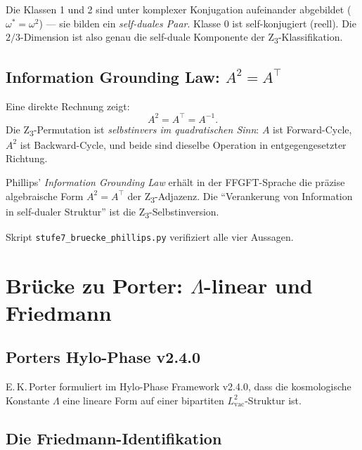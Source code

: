 Die Klassen 1 und 2 sind unter komplexer Konjugation aufeinander abgebildet (\(\omega^* = \omega^2\)) — sie bilden ein \emph{self-duales Paar}. Klasse 0 ist self-konjugiert (reell). Die \(2/3\)-Dimension ist also genau die self-duale Komponente der Z\textsubscript{3}-Klassifikation.

\subsection[Information Grounding Law: A^2=A^T]{Information Grounding Law: \(A^2 = A^\top\)}

Eine direkte Rechnung zeigt:
\begin{equation}
A^2 = A^\top = A^{-1}.
\label{eq:igl}
\end{equation}
Die Z\textsubscript{3}-Permutation ist \emph{selbstinvers im quadratischen Sinn}: \(A\) ist Forward-Cycle, \(A^2\) ist Backward-Cycle, und beide sind dieselbe Operation in entgegengesetzter Richtung.

\begin{interpretation}
Phillips' \emph{Information Grounding Law} erhält in der FFGFT-Sprache die präzise algebraische Form \(A^2 = A^\top\) der Z\textsubscript{3}-Adjazenz. Die ``Verankerung von Information in self-dualer Struktur'' ist die Z\textsubscript{3}-Selbstinversion.
\end{interpretation}

Skript \texttt{stufe7\_bruecke\_phillips.py} verifiziert alle vier Aussagen.

\section[Brücke zu Porter: Lambda-linear und Friedmann]{Brücke zu Porter: \(\Lambda\)-linear und Friedmann}
\label{sec:porter}

\subsection{Porters Hylo-Phase v2.4.0}

E.\,K.\,Porter formuliert im Hylo-Phase Framework v2.4.0, dass die kosmologische Konstante \(\Lambda\) eine lineare Form auf einer bipartiten \(L_\text{vac}^2\)-Struktur ist.

\subsection{Die Friedmann-Identifikation}

